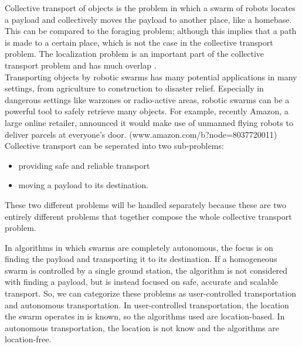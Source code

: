 
Collective transport of objects is the problem in which a swarm of robots locates a payload and collectively moves the payload to another place, like a homebase. 
This can be compared to the foraging problem; although this implies that a path is made to a certain place, which is not the case in the collective transport problem. \cite{hoff2010two}  
The localization problem is an important part of the collective transport problem and has much overlap .\\
Transporting objects by robotic swarms has many potential applications in many settings, from agriculture to construction to disaster relief. 
Especially in dangerous settings like warzones or radio-active areas, robotic swarms can be a powerful tool to safely retrieve many objects. 
For example, recently Amazon, a large online retailer, announced it would make use of unmanned flying robots to deliver parcels at everyone's door. (www.amazon.com/b?node=8037720011) \\

Collective transport can be seperated into two sub-problems:
\begin{itemize}
	\item  providing safe and reliable transport
	\item moving a payload to its destination.
\end{itemize}
These two different problems will be handled separately because these are two entirely different problems that together compose the whole collective transport problem. 

In algorithms in which swarms are completely autonomous, the focus is on finding the payload and transporting it to its destination.
If a homogeneous swarm is controlled by a single ground station, the algorithm is not considered with finding a payload, but is instead focused on safe, accurate and scalable transport. 
So, we can categorize these problems as user-controlled transportation and autonomous transportation.
In user-controlled transportation, the location the swarm operates in is known, so the algorithms used are location-based.
In autonomous transportation, the location is not know and the algorithms are location-free. \\

